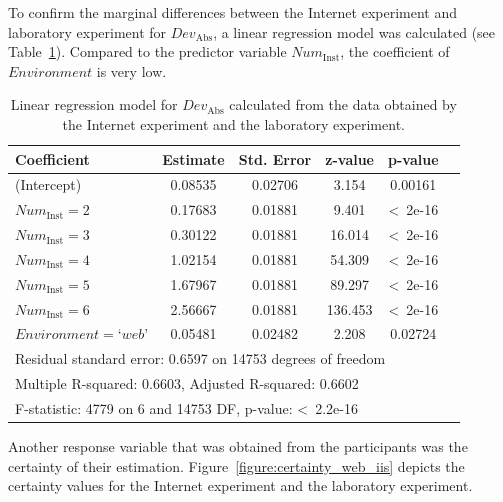 To confirm the marginal differences between the Internet experiment and laboratory experiment for $\textit{Dev}_{\mathrm{Abs}}$, a linear regression model was calculated (see Table~\ref{table:lm_absolute_deviation}). Compared to the predictor variable $\textit{Num}_{\mathrm{Inst}}$, the coefficient of $\textit{Environment}$ is very low.
\begin{table}[h]
\center
\scriptsize
\begin{tabular*}{0.45\textwidth}{p{1.5cm}ccccp{0.8cm}}
\toprule[1.5pt]
Coefficient & Estimate & Std. Error & z-value & p-value\\
\midrule
(Intercept) & 0.08535 & 0.02706 & 3.154 & 0.00161\\
$\textit{Num}_{\mathrm{Inst}} = 2$ & 0.17683 & 0.01881 & 9.401  & \textless~2e-16\\
$\textit{Num}_{\mathrm{Inst}} = 3$ & 0.30122 & 0.01881 & 16.014  & \textless~2e-16\\
$\textit{Num}_{\mathrm{Inst}} = 4$ & 1.02154 & 0.01881 & 54.309  & \textless~2e-16\\
$\textit{Num}_{\mathrm{Inst}} = 5$ & 1.67967 & 0.01881 & 89.297  & \textless~2e-16\\
$\textit{Num}_{\mathrm{Inst}} = 6$ & 2.56667 & 0.01881 & 136.453  & \textless~2e-16\\
$\textit{Environment} = \textrm{`}web\textrm{'}$ & 0.05481 & 0.02482 & 2.208  & 0.02724\\
\midrule
\multicolumn{5}{l}{Residual standard error: 0.6597 on 14753 degrees of freedom}\\
\multicolumn{5}{l}{Multiple R-squared: 0.6603,	Adjusted R-squared: 0.6602}\\
\multicolumn{5}{l}{F-statistic:  4779 on 6 and 14753 DF,  p-value: \textless~2.2e-16}\\
\bottomrule[1.5pt]
\end{tabular*}
\caption{Linear regression model for $\textit{Dev}_{\mathrm{Abs}}$ calculated from the data obtained by the Internet experiment and the laboratory experiment.}
\label{table:lm_absolute_deviation}
\end{table}

Another response variable that was obtained from the participants was the certainty of their estimation. Figure~\ref{figure:certainty_web_iis} depicts the certainty values for the Internet experiment and the laboratory experiment.


